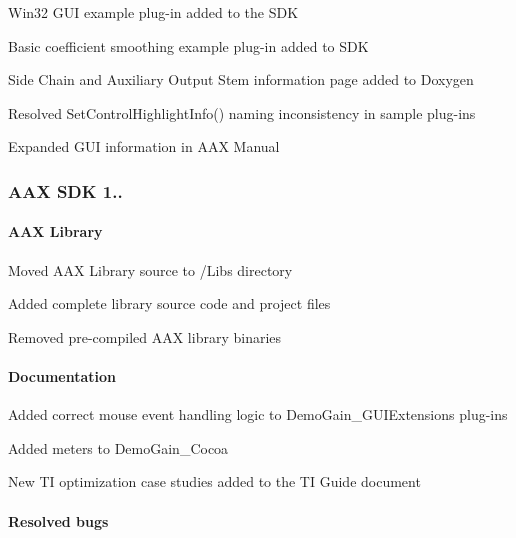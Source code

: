 \begin{DoxyItemize}
\item Win32 G\+U\+I example plug-\/in added to the S\+D\+K 
\item Basic coefficient smoothing example plug-\/in added to S\+D\+K 
\item Side Chain and Auxiliary Output Stem information page added to Doxygen 
\item Resolved Set\+Control\+Highlight\+Info() naming inconsistency in sample plug-\/ins 
\item Expanded G\+U\+I information in A\+A\+X Manual 
\end{DoxyItemize}\hypertarget{a00375_aax_sdk_1p0p2}{}\subsubsection{A\+A\+X S\+D\+K 1..}\label{a00375_aax_sdk_1p0p2}
\hypertarget{a00375_aax_sdk_1p0p2_AAXLibrary}{}\paragraph{A\+A\+X Library}\label{a00375_aax_sdk_1p0p2_AAXLibrary}

\begin{DoxyItemize}
\item Moved A\+A\+X Library source to /\+Libs directory 
\item Added complete library source code and project files 
\item Removed pre-\/compiled A\+A\+X library binaries  
\end{DoxyItemize}\hypertarget{a00375_aax_sdk_1p0p2_Documentation}{}\paragraph{Documentation}\label{a00375_aax_sdk_1p0p2_Documentation}

\begin{DoxyItemize}
\item Added correct mouse event handling logic to Demo\+Gain\+\_\+\+G\+U\+I\+Extensions plug-\/ins 
\item Added meters to Demo\+Gain\+\_\+\+Cocoa 
\item New T\+I optimization case studies added to the T\+I Guide document 
\end{DoxyItemize}\hypertarget{a00375_aax_sdk_1p0p2_ResolvedBugs}{}\paragraph{Resolved bugs}\label{a00375_aax_sdk_1p0p2_ResolvedBugs}

